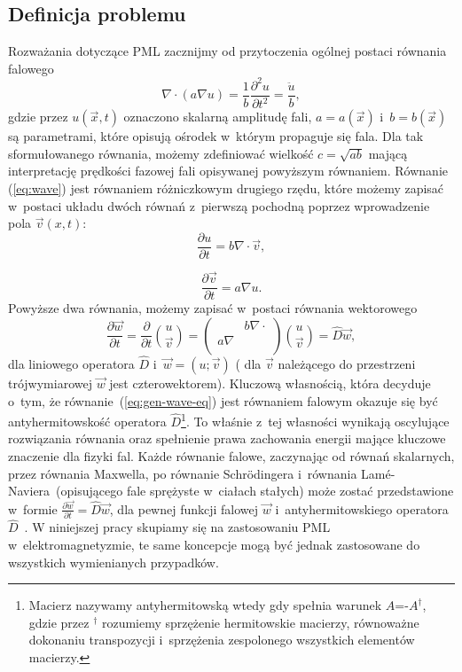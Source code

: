 \subsection{Definicja problemu}
Rozważania dotyczące PML zacznijmy od przytoczenia ogólnej postaci równania falowego~\cite{barton1989elements}
\begin{equation}
\nabla \cdot ( a \nabla u) = \frac{1}{b} \frac{\partial^2 u}{\partial t^2} = \frac{\ddot{u}}{b},
\label{eq:wave}
\end{equation}
gdzie przez $u(\vec{x},t)$ oznaczono skalarną amplitudę fali, $a=a(\vec{x})$ i~$b=b(\vec{x})$ są parametrami, które opisują ośrodek w~którym propaguje się fala. Dla tak sformułowanego równania, możemy zdefiniować wielkość $c=\sqrt{ab}$ mającą interpretację prędkości fazowej fali opisywanej powyższym równaniem. Równanie (\ref{eq:wave}) jest równaniem różniczkowym drugiego rzędu, które możemy zapisać w~postaci układu dwóch równań z~pierwszą pochodną poprzez wprowadzenie pola $\vec{v}(x,t)$:
\begin{equation}
\frac{\partial u}{\partial t} = b \nabla \cdot \vec{v},
\end{equation}

\begin{equation}
\frac{\partial \vec{v}}{\partial t}= a\nabla u.
\end{equation}
Powyższe dwa równania, możemy zapisać  w~postaci równania wektorowego
\begin{equation}
\frac{\partial \vec{w}}{\partial t}=\frac{\partial}{\partial t} {u \choose \vec{v}} = 
	\begin{pmatrix}
		& b\nabla\cdot \\
	a\nabla & \\
	\end{pmatrix}
{u \choose \vec{v}} = \hat{D}\vec{w},
\label{eq:gen-wave-eq}
\end{equation}
dla liniowego operatora $\hat{D}$ i~$\vec{w}=(u;\vec{v})$ ( dla $\vec{v}$ należącego do przestrzeni trójwymiarowej $\vec{w}$ jest czterowektorem). Kluczową własnością, która decyduje o~tym, że równanie~(\ref{eq:gen-wave-eq}) jest równaniem falowym okazuje się być antyhermitowskość operatora $\hat{D}$\footnote{Macierz nazywamy antyhermitowską wtedy gdy spełnia warunek $A$=-$A^\dag$, gdzie przez $^\dag$ rozumiemy sprzężenie hermitowskie macierzy, równoważne dokonaniu transpozycji i~sprzężenia zespolonego wszystkich elementów macierzy.}. To właśnie z~tej własności wynikają oscylujące rozwiązania równania oraz spełnienie prawa zachowania energii mające kluczowe znaczenie dla fizyki fal. Każde równanie falowe, zaczynając od równań skalarnych, przez równania Maxwella,  po równanie Schr\"{o}dingera i~równania Lam\'{e}-Naviera~(opisującego fale sprężyste w~ciałach stałych) może zostać przedstawione w~formie $ \frac{\partial  \vec{w}}{\partial t}=\hat{D}\vec{w}$, dla pewnej funkcji falowej $\vec{w}$ i~antyhermitowskiego operatora $\hat{D}$~\cite{johnson2007notes}. W niniejszej pracy skupiamy się na zastosowaniu PML w~elektromagnetyzmie, te same koncepcje mogą być jednak zastosowane do wszystkich wymienianych przypadków.

